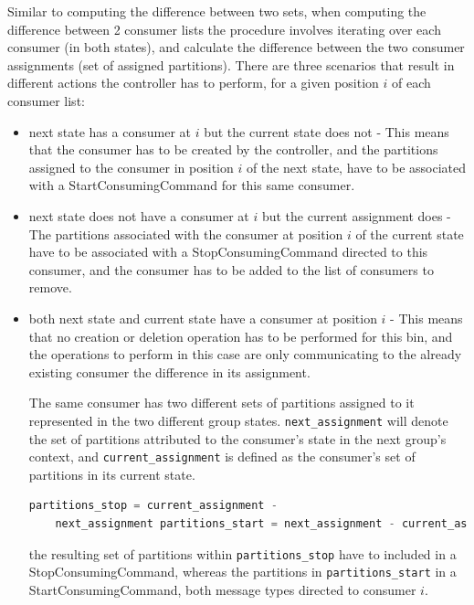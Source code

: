 Similar to computing the difference between two sets, when computing the
difference between 2 consumer lists the procedure involves iterating over each
consumer (in both states), and calculate the difference between the two consumer
assignments (set of assigned partitions). There are three scenarios that result
in different actions the controller has to perform, for a given position $i$ of
each consumer list: \begin{itemize} \item next state has a consumer at $i$ but
            the current state does not - This means that the consumer has to be
            created by the controller, and the partitions assigned to the
            consumer in position $i$ of the next state, have to be associated
            with a StartConsumingCommand for this same consumer.  \item next
                state does not have a consumer at $i$ but the current assignment
                does - The partitions associated with the consumer at position
                $i$ of the current state have to be associated with a
                StopConsumingCommand directed to this consumer, and the consumer
                has to be added to the list of consumers to remove.  \item both
                    next state and current state have a consumer at position $i$
                    - This means that no creation or deletion operation has to
                    be performed for this bin, and the operations to perform in
                    this case are only communicating to the already existing
                    consumer the difference in its assignment. 
    
    The same consumer has two different sets of partitions assigned to it
        represented in the two different group states.
        \lstinline[language=Python]{next_assignment} will denote the set of
        partitions attributed to the consumer's state in the next group's
        context, and \lstinline[language=Python]{current_assignment} is defined
        as the consumer's set of partitions in its current state.
    
    \begin{lstlisting}[language=Python] partitions_stop = current_assignment -
    next_assignment partitions_start = next_assignment - current_assignment
    \end{lstlisting} the resulting set of partitions within
        \lstinline[language=Python]{partitions_stop} have to included in a
        StopConsumingCommand, whereas the partitions in
        \lstinline[language=Python]{partitions_start} in a
        StartConsumingCommand, both message types directed to consumer $i$.
\end{itemize}

